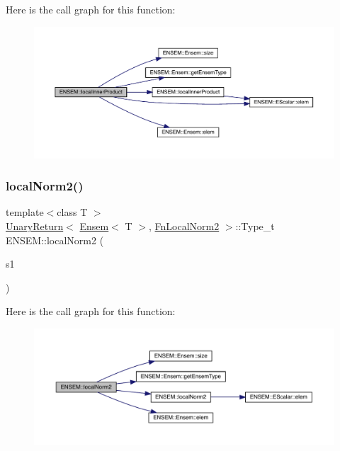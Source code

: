 Here is the call graph for this function\+:\nopagebreak
\begin{figure}[H]
\begin{center}
\leavevmode
\includegraphics[width=350pt]{d1/d9e/group__eensem_gad3fbed60bbedae0c1abcbdbfc4bbcc0a_cgraph}
\end{center}
\end{figure}
\mbox{\label{group__eensem_gadea3947facb136bb23ca06c2e6e09400}} 
\subsubsection{\texorpdfstring{localNorm2()}{localNorm2()}}
{\footnotesize\ttfamily template$<$class T $>$ \\
\mbox{\hyperlink{structENSEM_1_1UnaryReturn}{Unary\+Return}}$<$ \mbox{\hyperlink{classENSEM_1_1Ensem}{Ensem}}$<$ T $>$, \mbox{\hyperlink{structENSEM_1_1FnLocalNorm2}{Fn\+Local\+Norm2}} $>$\+::Type\+\_\+t E\+N\+S\+E\+M\+::local\+Norm2 (\begin{DoxyParamCaption}\item[{const \mbox{\hyperlink{classENSEM_1_1Ensem}{Ensem}}$<$ T $>$ \&}]{s1 }\end{DoxyParamCaption})\hspace{0.3cm}{\ttfamily [inline]}}

Here is the call graph for this function\+:\nopagebreak
\begin{figure}[H]
\begin{center}
\leavevmode
\includegraphics[width=350pt]{d1/d9e/group__eensem_gadea3947facb136bb23ca06c2e6e09400_cgraph}
\end{center}
\end{figure}
\mbox{\label{group__eensem_gade72fe6a4a31fa197d470c2ea6ce63a8}} 
